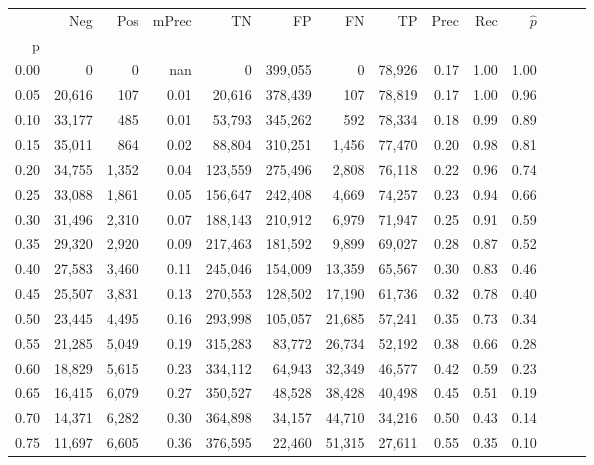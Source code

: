 \begin{tabular}{rrrrrrrrrrrrrr}
\toprule
{} &     Neg &    Pos & mPrec &       TN &       FP &      FN &      TP &  Prec &   Rec & $\hat{p}$ \\
p    &         &        &       &          &          &         &         &       &       &           \\
\midrule
0.00 &       0 &      0 &   nan &        0 &  399,055 &       0 &  78,926 &  0.17 &  1.00 &      1.00 \\
0.05 &  20,616 &    107 &  0.01 &   20,616 &  378,439 &     107 &  78,819 &  0.17 &  1.00 &      0.96 \\
0.10 &  33,177 &    485 &  0.01 &   53,793 &  345,262 &     592 &  78,334 &  0.18 &  0.99 &      0.89 \\
0.15 &  35,011 &    864 &  0.02 &   88,804 &  310,251 &   1,456 &  77,470 &  0.20 &  0.98 &      0.81 \\
0.20 &  34,755 &  1,352 &  0.04 &  123,559 &  275,496 &   2,808 &  76,118 &  0.22 &  0.96 &      0.74 \\
0.25 &  33,088 &  1,861 &  0.05 &  156,647 &  242,408 &   4,669 &  74,257 &  0.23 &  0.94 &      0.66 \\
0.30 &  31,496 &  2,310 &  0.07 &  188,143 &  210,912 &   6,979 &  71,947 &  0.25 &  0.91 &      0.59 \\
0.35 &  29,320 &  2,920 &  0.09 &  217,463 &  181,592 &   9,899 &  69,027 &  0.28 &  0.87 &      0.52 \\
0.40 &  27,583 &  3,460 &  0.11 &  245,046 &  154,009 &  13,359 &  65,567 &  0.30 &  0.83 &      0.46 \\
0.45 &  25,507 &  3,831 &  0.13 &  270,553 &  128,502 &  17,190 &  61,736 &  0.32 &  0.78 &      0.40 \\
0.50 &  23,445 &  4,495 &  0.16 &  293,998 &  105,057 &  21,685 &  57,241 &  0.35 &  0.73 &      0.34 \\
0.55 &  21,285 &  5,049 &  0.19 &  315,283 &   83,772 &  26,734 &  52,192 &  0.38 &  0.66 &      0.28 \\
0.60 &  18,829 &  5,615 &  0.23 &  334,112 &   64,943 &  32,349 &  46,577 &  0.42 &  0.59 &      0.23 \\
0.65 &  16,415 &  6,079 &  0.27 &  350,527 &   48,528 &  38,428 &  40,498 &  0.45 &  0.51 &      0.19 \\
0.70 &  14,371 &  6,282 &  0.30 &  364,898 &   34,157 &  44,710 &  34,216 &  0.50 &  0.43 &      0.14 \\
0.75 &  11,697 &  6,605 &  0.36 &  376,595 &   22,460 &  51,315 &  27,611 &  0.55 &  0.35 &      0.10 \\

\end{tabular}

